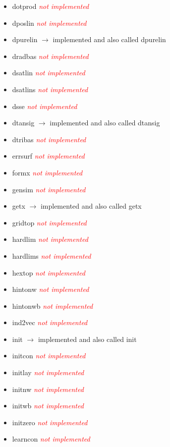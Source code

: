 \begin{itemize}
	\item dotprod \textcolor{red}{\textit{not implemented}}
	\item dposlin \textcolor{red}{\textit{not implemented}}
	\item dpurelin $\rightarrow$ implemented and also called dpurelin
	\item dradbas \textcolor{red}{\textit{not implemented}}
	\item dsatlin \textcolor{red}{\textit{not implemented}}
	\item dsatlins \textcolor{red}{\textit{not implemented}}
	\item dsse \textcolor{red}{\textit{not implemented}}
	\item dtansig $\rightarrow$ implemented and also called dtansig
	\item dtribas \textcolor{red}{\textit{not implemented}}
	\item errsurf \textcolor{red}{\textit{not implemented}}
	\item formx \textcolor{red}{\textit{not implemented}}
	\item gensim \textcolor{red}{\textit{not implemented}}
	\item getx $\rightarrow$ implemented and also called getx
	\item gridtop \textcolor{red}{\textit{not implemented}}
	\item hardlim \textcolor{red}{\textit{not implemented}}
	\item hardlims \textcolor{red}{\textit{not implemented}}
	\item hextop \textcolor{red}{\textit{not implemented}} 
	\item hintonw \textcolor{red}{\textit{not implemented}}
	\item hintonwb \textcolor{red}{\textit{not implemented}}
	\item ind2vec \textcolor{red}{\textit{not implemented}}
	\item init $\rightarrow$ implemented and also called init 
	\item initcon \textcolor{red}{\textit{not implemented}}
	\item initlay \textcolor{red}{\textit{not implemented}}
	\item initnw \textcolor{red}{\textit{not implemented}}
	\item initwb \textcolor{red}{\textit{not implemented}} 
	\item initzero \textcolor{red}{\textit{not implemented}}
	\item learncon \textcolor{red}{\textit{not implemented}}

\end{itemize}
